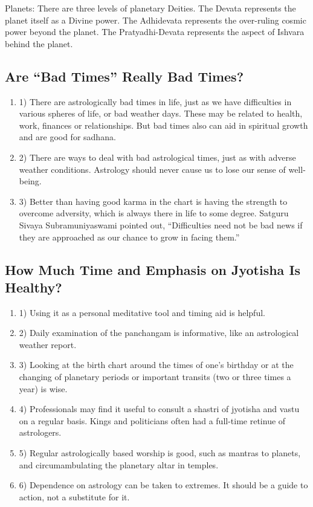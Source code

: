  

Planets: There are three levels of planetary Deities. The Devata represents the planet itself as a Divine power. The Adhidevata represents the over-ruling cosmic power beyond the planet. The Pratyadhi-Devata represents the aspect of Ishvara behind the planet.


\subsection{Are “Bad Times” Really Bad Times?}
 

\begin{enumerate}
	\item[] 1) There are astrologically bad times in life, just as we have difficulties in various spheres of life, or bad weather days. These may be related to health, work, finances or relationships. But bad times also can aid in spiritual growth and are good for sadhana.

	\item[] 2) There are ways to deal with bad astrological times, just as with adverse weather conditions. Astrology should never cause us to lose our sense of well-being.

	\item[] 3) Better than having good karma in the chart is having the strength to overcome adversity, which is always there in life to some degree. Satguru Sivaya Subramuniyaswami pointed out, “Difficulties need not be bad news if they are approached as our chance to grow in facing them.”
\end{enumerate}
 

\subsection{How Much Time and Emphasis on Jyotisha Is Healthy?}
 

\begin{enumerate}
\item[] 1) Using it as a personal meditative tool and timing aid is helpful.

\item[] 2) Daily examination of the panchangam is informative, like an astrological weather report.

\item[] 3) Looking at the birth chart around the times of one’s birthday or at the changing of planetary periods or important transits (two or three times a year) is wise.

\item[] 4) Professionals may find it useful to consult a shastri of jyotisha and vastu on a regular basis. Kings and politicians often had a full-time retinue of astrologers.

\item[] 5) Regular astrologically based worship is good, such as mantras to planets, and circumambulating the planetary altar in temples.

\item[] 6) Dependence on astrology can be taken to extremes. It should be a guide to action, not a substitute for it.
\end{enumerate}